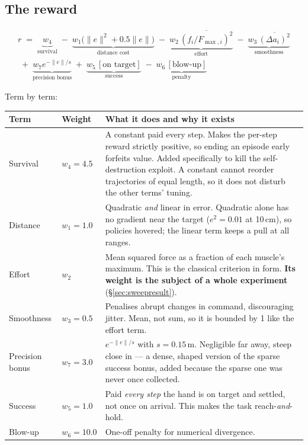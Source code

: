 \subsection{The reward}
\label{sec:reward}

\begin{multline*}
r \;=\; \underbrace{w_4}_{\text{survival}}
\;-\;\underbrace{w_1\big(\|e\|^2 + 0.5\|e\|\big)}_{\text{distance cost}}
\;-\;\underbrace{w_2\, \overline{(f_i/F_{\max,i})^2}}_{\text{effort}}
\;-\;\underbrace{w_3\, \overline{(\Delta a_i)^2}}_{\text{smoothness}}\\[4pt]
\;+\;\underbrace{w_7 e^{-\|e\|/s}}_{\text{precision bonus}}
\;+\;\underbrace{w_5 \,[\text{on target}]}_{\text{success}}
\;-\;\underbrace{w_6 \,[\text{blow-up}]}_{\text{penalty}}
\end{multline*}

Term by term:

\begin{longtable}{@{} L{2.6cm} C{1.4cm} L{10.4cm} @{}}
\toprule
\textbf{Term} & \textbf{Weight} & \textbf{What it does and why it exists} \\
\midrule
\endhead
Survival & $w_4 = 4.5$ & A constant paid every step. Makes the per-step reward strictly positive, so ending an episode early forfeits value. Added specifically to kill the self-destruction exploit. A constant cannot reorder trajectories of equal length, so it does not disturb the other terms' tuning. \\
Distance & $w_1 = 1.0$ & Quadratic \emph{and} linear in error. Quadratic alone has no gradient near the target ($e^2 = 0.01$ at 10\,cm), so policies hovered; the linear term keeps a pull at all ranges. \\
Effort & $w_2$ & Mean squared force as a fraction of each muscle's maximum. This is the classical criterion in form. \textbf{Its weight is the subject of a whole experiment} (\S\ref{sec:sweepresult}). \\
Smoothness & $w_3 = 0.5$ & Penalises abrupt changes in command, discouraging jitter. Mean, not sum, so it is bounded by 1 like the effort term. \\
Precision bonus & $w_7 = 3.0$ & $e^{-\|e\|/s}$ with $s = 0.15$\,m. Negligible far away, steep close in --- a dense, shaped version of the sparse success bonus, added because the sparse one was never once collected. \\
Success & $w_5 = 1.0$ & Paid \emph{every step} the hand is on target and settled, not once on arrival. This makes the task reach-\emph{and}-hold. \\
Blow-up & $w_6 = 10.0$ & One-off penalty for numerical divergence. \\
\bottomrule
\end{longtable}

